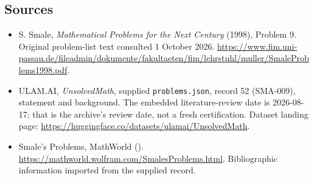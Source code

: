 \documentclass[11pt,a4paper]{article}
\begin{document}
\subsection{Sources}

{\small

\begin{itemize}
\item[E1] S. Smale, \emph{Mathematical Problems for the Next Century} (1998), Problem 9. Original problem-list text consulted 1 October 2026. \url{https://www.fim.uni-passau.de/fileadmin/dokumente/fakultaeten/fim/lehrstuhl/muller/SmaleProblems1998.pdf}.


\item[\hypertarget{source:52:1}{S1}] ULAM.AI, \emph{UnsolvedMath}, supplied \texttt{problems.json}, record 52 (SMA-009), statement and background. The embedded literature-review date is 2026-08-17; that is the archive’s review date, not a fresh certification. Dataset landing page: \url{https://huggingface.co/datasets/ulamai/UnsolvedMath}.

\item[\hypertarget{source:52:2}{S2}] Smale's Problems, MathWorld (). \url{https://mathworld.wolfram.com/SmalesProblems.html}. Bibliographic information imported from the supplied record.

\end{itemize}

}

\label{end:52}
\end{document}

